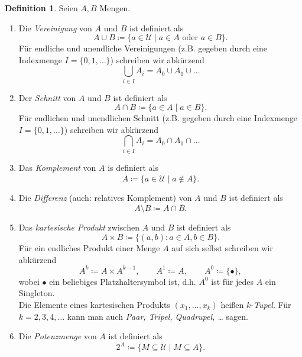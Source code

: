 \documentclass[11pt, a4paper]{article}
\theoremstyle{definition}
\newtheorem{definition}{Definition}[section]
\theoremstyle{plain}
\numberwithin{equation}{section}
\newcommand{\comp}[1]{\overline{#1}}
\begin{document}
\begin{definition}\label{def:setops}
	Seien \( A, B \) Mengen. 
	\begin{enumerate}[label=(\alph*)]
		\item Die \textit{Vereinigung} von \( A \) und \( B \) ist definiert als 
			\[ 
				A \cup B \coloneqq \{ a \in \mathcal{U} \mid a \in A \text{ oder } a \in B \}.
			\]
			Für endliche und unendliche Vereinigungen (z.B. gegeben durch eine Indexmenge \( I = \{ 0, 1, \ldots \} \)) schreiben wir abkürzend
			\[
				\bigcup_{i \in I} A_i = A_0 \cup A_1 \cup \ldots
			\]
		\item Der \textit{Schnitt} von \( A \) und \( B \) ist definiert als
			\[
				A \cap B \coloneqq \{ a \in A \mid a \in B \}.
			\]
			Für endlichen und unendlichen Schnitt (z.B. gegeben durch eine Indexmenge \( I = \{ 0, 1, \ldots \} \)) schreiben wir abkürzend
			\[
				\bigcap_{i \in I} A_i = A_0 \cap A_1 \cap \ldots
			\]
		\item Das \textit{Komplement} von \( A \) is definiert als
			\[
				\comp{A} \coloneqq \{ a \in \mathcal{U} \mid a \notin A \}.
			\]
		\item Die \textit{Differenz} (auch: relatives Komplement) von \( A \) und \( B \) ist definiert als
			\[
				A \setminus B \coloneqq A \cap \comp{B}.
			\]
		\item Das \textit{kartesische Produkt} zwischen \( A \) und \( B \) ist definiert als
			\[
				A \times B \coloneqq \{(a, b) : a \in A, b \in B \}.
			\]
			Für ein endliches Produkt einer Menge \( A \) auf sich selbst schreiben wir abkürzend
			\[
				A^k \coloneqq A \times A^{k-1}, \quad\quad A^1 \coloneqq A, \quad\quad A^0 \coloneqq \{ \bullet \},
			\]
			wobei \( \bullet \) ein beliebiges Platzhaltersymbol ist, d.h. \( A^0 \) ist für jedes \( A \) ein Singleton.\\
			Die Elemente eines kartesischen Produkts \( (x_1, \ldots, x_k) \) heißen \( k\)-\textit{Tupel}. Für \( k = 2, 3, 4, \ldots \) kann man auch \textit{Paar, Tripel, Quadrupel, \ldots} sagen.
		\item Die \textit{Potenzmenge} von \( A \) ist definiert als
			\[
				2^A \coloneqq \{ M \subseteq \mathcal{U} \mid M \subseteq A \}.
			\]
	\end{enumerate}
\end{definition}
\end{document}
